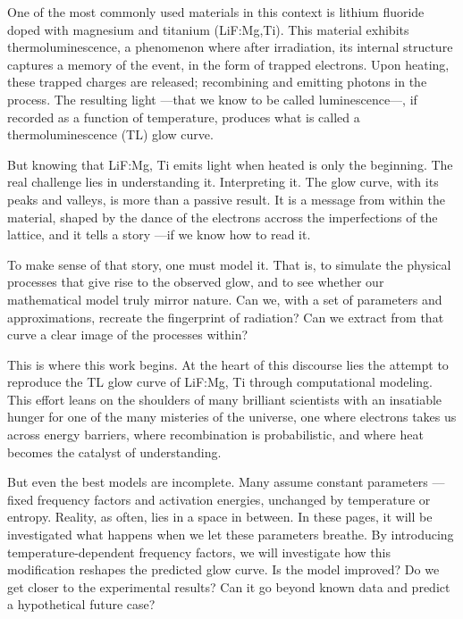 \vspace{10pt}

One of the most commonly used materials in this context is lithium fluoride doped with magnesium and titanium (LiF:Mg,Ti). This material exhibits thermoluminescence, a phenomenon where after irradiation, its internal structure captures a memory of the event, in the form of trapped electrons. Upon heating, these trapped charges are released; recombining and emitting photons in the process. The resulting light ---that we know to be called luminescence---, if recorded as a function of temperature, produces what is called a thermoluminescence (TL) glow curve. %

But knowing that LiF:Mg, Ti emits light when heated is only the beginning. The real challenge lies in understanding it. Interpreting it. The glow curve, with its peaks and valleys, is more than a passive result. It is a message from within the material, shaped by the dance of the electrons accross the imperfections of the lattice, and it tells a story ---if we know how to read it.

\vspace{10pt}

To make sense of that story, one must model it. That is, to simulate the physical processes that give rise to the observed glow, and to see whether our mathematical model truly mirror nature. Can we, with a set of parameters and approximations, recreate the fingerprint of radiation? Can we extract from that curve a clear image of the processes within?

\vspace{10pt}

This is where this work begins. At the heart of this discourse lies the attempt to reproduce the TL glow curve of LiF:Mg, Ti through computational modeling. This effort leans on the shoulders of many brilliant scientists with an insatiable hunger for one of the many misteries of the universe, one where electrons takes us across energy barriers, where recombination is probabilistic, and where heat becomes the catalyst of understanding.

\vspace{10pt}

But even the best models are incomplete. Many assume constant parameters ---fixed frequency factors and activation energies, unchanged by temperature or entropy. Reality, as often, lies in a space in between. In these pages, it will be investigated what happens when we let these parameters breathe. By introducing temperature-dependent frequency factors, we will investigate how this modification reshapes the predicted glow curve. Is the model improved? Do we get closer to the experimental results? Can it go beyond known data and predict a hypothetical future case?


